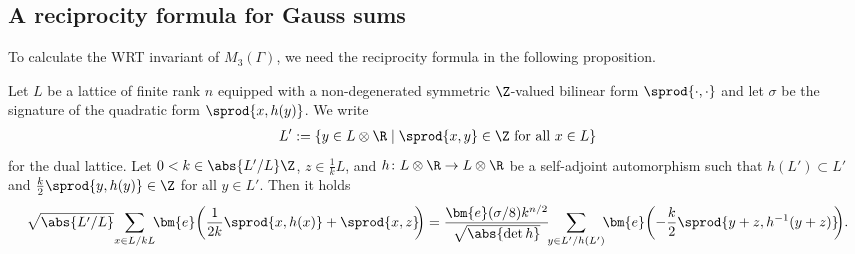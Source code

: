 \subsection{A reciprocity formula for Gauss sums}%


To calculate the WRT invariant of $ M_3(\Gamma) $, we need the reciprocity formula in the following proposition.

\begin{prop}[{\cite[Theorem 1]{DT}}] \label{prop:reciprocity}
	Let $ L $ be a lattice of finite rank $ n $ equipped with a non-degenerated symmetric $ \Z $-valued bilinear form $ \sprod{\cdot, \cdot} $
	and let $ \sigma $ be the signature of the quadratic form $ \sprod{x, h(y)} $.
	We write
	\begin{gather*}
	L' := \{ y \in L \otimes \R \mid \sprod{x, y} \in \Z \text{ for all } x \in L \}
	\end{gather*}
	for the dual lattice.
	Let $ 0 < k \in \abs{L'/L} \Z$, $z \in \frac{1}{k} L $,
	and $ h \colon L \otimes \R \to L \otimes \R $ be a self-adjoint automorphism such that $ h(L') \subset L' $ and $ \frac{k}{2} \sprod{y, h(y)} \in \Z $ for all $ y \in L' $.
	Then it holds
	\begin{gather*}
\sqrt{\abs{L'/L}}\! \sum_{x \in L/kL}\!\! \bm{e} \bigg( \frac{1}{2k} \sprod{x, h(x)} + \sprod{x, z}\!\! \bigg)
= \frac{\bm{e}(\sigma/8) k^{n/2}}{\sqrt{\abs{\det h}}}
	\!\!	\sum_{y \in L'/h(L')}\!\! \bm{e} \bigg({-}\frac{k}{2} \sprod{y + z, h^{-1}(y + z)}\!\! \bigg).
	\end{gather*}
\end{prop}


